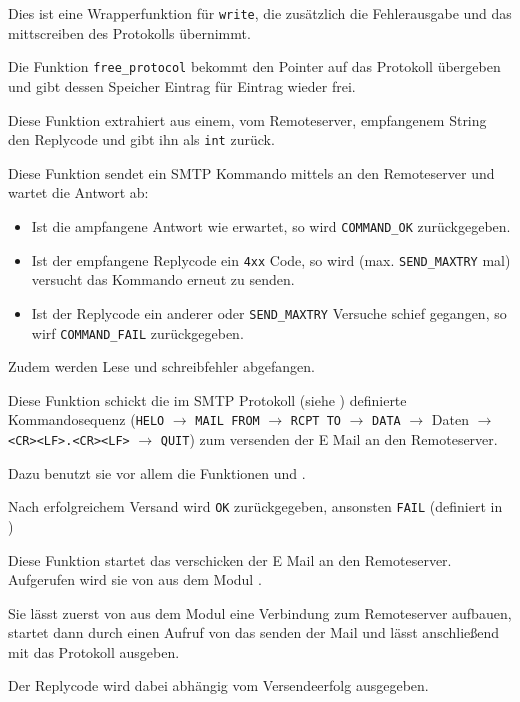 \label{fn:write_remote}
Dies ist eine Wrapperfunktion f\"{u}r \texttt{write}, die zus\"{a}tzlich die Fehlerausgabe und das mittscreiben des Protokolls \"{u}bernimmt.

\label{fn:free_protocol}
Die Funktion \texttt{free\_protocol} bekommt den Pointer auf das Protokoll \"{u}bergeben und gibt dessen Speicher Eintrag f\"{u}r Eintrag wieder frei.

\label{fn:extract_status}
Diese Funktion extrahiert aus einem, vom Remoteserver, empfangenem String den Replycode und gibt ihn als \texttt{int} zur\"{u}ck.

\label{fn:try_command}
Diese Funktion sendet ein SMTP Kommando mittels  an den Remoteserver und wartet die Antwort ab: 
\begin{itemize}
  \item Ist die ampfangene Antwort wie erwartet, so wird \texttt{COMMAND\_OK} zur\"{u}ckgegeben. 
  \item Ist der empfangene Replycode ein \texttt{4xx} Code, so wird (max. \texttt{SEND\_MAXTRY} mal) versucht das Kommando erneut zu senden. 
  \item Ist der Replycode ein anderer oder \texttt{SEND\_MAXTRY} Versuche schief gegangen, so wirf \texttt{COMMAND\_FAIL} zur\"{u}ckgegeben.
\end{itemize}
Zudem werden Lese und schreibfehler abgefangen.


\label{fn:send_mail}
Diese Funktion schickt die im SMTP Protokoll (siehe ) definierte Kommandosequenz (\texttt{HELO} $\rightarrow$ \texttt{MAIL FROM} $\rightarrow$ \texttt{RCPT TO} $\rightarrow$ \texttt{DATA} $\rightarrow$ Daten $\rightarrow$ \texttt{<CR><LF>.<CR><LF>} $\rightarrow$ \texttt{QUIT}) zum versenden der E Mail an den Remoteserver.

Dazu benutzt sie vor allem die Funktionen  und .

Nach erfolgreichem Versand wird \texttt{OK} zur\"{u}ckgegeben, ansonsten \texttt{FAIL} (definiert in )

\label{fn:forward_mail}
Diese Funktion startet das verschicken der E Mail an den Remoteserver. Aufgerufen wird sie von  aus dem Modul .

Sie l\"{a}sst zuerst von  aus dem Modul  eine Verbindung zum Remoteserver aufbauen, startet dann durch einen Aufruf von  das senden der Mail und l\"{a}sst anschließend mit  das Protokoll ausgeben. 

Der Replycode wird dabei abh\"{a}ngig vom Versendeerfolg ausgegeben.





